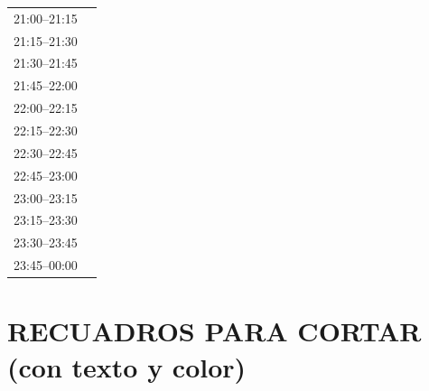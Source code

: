 \documentclass[11pt,a4paper]{article}
\begin{document}
\begin{center}
\begin{adjustbox}{max totalsize={\textwidth}{0.82\textheight},center}
\begin{tabular}{|p{3.6cm}|p{11cm}|}
\cline{1-1}
{\centering\rule{0pt}{2.80ex}21:00--21:15} & {\centering\rule{0pt}{2.80ex}} \\
\cline{1-1}
{\centering\rule{0pt}{2.80ex}21:15--21:30} & {\centering\rule{0pt}{2.80ex}} \\
\cline{1-1}
{\centering\rule{0pt}{2.80ex}21:30--21:45} & {\centering\rule{0pt}{2.80ex}} \\
\cline{1-1}
{\centering\rule{0pt}{2.80ex}21:45--22:00} & {\centering\rule{0pt}{2.80ex}} \\
\cline{1-1}
{\centering\rule{0pt}{2.80ex}22:00--22:15} & {\centering\rule{0pt}{2.80ex}} \\
\cline{1-1}
{\centering\rule{0pt}{2.80ex}22:15--22:30} & {\centering\rule{0pt}{2.80ex}} \\
\cline{1-1}
{\centering\rule{0pt}{2.80ex}22:30--22:45} & {\centering\rule{0pt}{2.80ex}} \\
\cline{1-1}
{\centering\rule{0pt}{2.80ex}22:45--23:00} & {\centering\rule{0pt}{2.80ex}} \\
\cline{1-1}
{\centering\rule{0pt}{2.80ex}23:00--23:15} & {\centering\rule{0pt}{2.80ex}} \\
\cline{1-1}
{\centering\rule{0pt}{2.80ex}23:15--23:30} & {\centering\rule{0pt}{2.80ex}} \\
\cline{1-1}
{\centering\rule{0pt}{2.80ex}23:30--23:45} & {\centering\rule{0pt}{2.80ex}} \\
\cline{1-1}
{\centering\rule{0pt}{2.80ex}23:45--00:00} & {\centering\rule{0pt}{2.80ex}} \\
\cline{1-1}
\hline
\end{tabular}
\end{adjustbox}
\end{center}

\clearpage
\section*{RECUADROS PARA CORTAR (con texto y color)}
\end{document}
